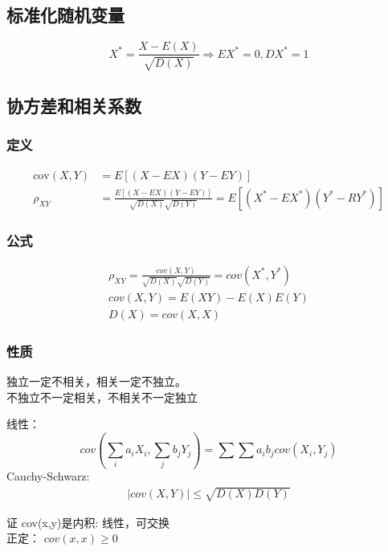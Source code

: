 \documentclass[a4paper]{ctexart}
\begin{document}
\subsection{标准化随机变量}
\begin{equation*}
    X^*=\frac{X-E(X)}{\sqrt{D(X)}}\Longrightarrow EX^*=0, DX^*=1
\end{equation*}
\subsection{协方差和相关系数}
\subsubsection{定义}
\begin{equation*}
    \begin{aligned}
        \text{cov}(X,Y) & =E[(X-EX)(Y-EY)]                                                        \\
        \rho_{XY}       & =\frac{E[(X-EX)(Y-EY)]}{\sqrt{D(X)}\sqrt{D(Y)}}=E[(X^*-EX^*)(Y^*-RY^*)]
    \end{aligned}
\end{equation*}
\subsubsection{公式}
\begin{gather*}
    \rho_{XY}=\frac{cov(X,Y)}{\sqrt{D(X)}\sqrt{D(Y)}}=cov(X^*,Y^*)\\
    cov(X,Y)=E(XY)-E(X)E(Y)\\
    D(X)=cov(X,X)
\end{gather*}
\subsubsection{性质}
独立一定不相关，相关一定不独立。\\
不独立不一定相关，不相关不一定独立

线性：
\begin{equation*}
    cov(\sum_i a_iX_i, \sum_j b_jY_j)=\sum\sum a_ib_j cov(X_i,Y_j)
\end{equation*}
Cauchy-Schwarz:
\begin{gather*}
    |cov(X,Y)|\leq \sqrt{D(X)D(Y)}
\end{gather*}
\begin{center}
    {\small
        证 cov(x,y)是内积: 线性，可交换\\
        正定： $cov(x,x)\geq 0$
    }
\end{center}
\end{document}
